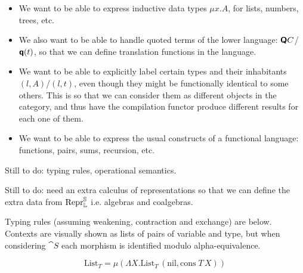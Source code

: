 \begin{itemize}
  \item We want to be able to express inductive data types $\mu x . A$, for lists,
        numbers, trees, etc.
  \item We also want to be able to handle quoted terms of the lower language: $\textsf{\textbf{Q}}
          C$/$\textsf{\textbf{q}}(t)$, so that we can define translation functions in the language.
  \item We want to be able to explicitly label certain types and their inhabitants $(l,
          A)$/$(l, t)$, even though they might be functionally identical to some others.
        This is so that we can consider them as different objects in the category, and
        thus have the compilation functor produce different results for each one of
        them.
  \item We want to be able to express the usual constructs of a functional language:
        functions, pairs, sums, recursion, etc.
\end{itemize}

Still to do: typing rules, operational semantics.

Still to do: need an extra calculus of representations so that we can define
the extra data from $\mathrm{Repr} _{\mathbb L} ^{\mathbb S}$ i.e. algebras and coalgebras.

Typing rules (assuming weakening, contraction and exchange) are below. Contexts
are visually shown as lists of pairs of variable and type, but when considering
$\cat S$ each morphism is identified modulo alpha-equivalence.

$$
  \text{List}_T = \mu (\Lambda X. \text{List}_T \, (\text{nil}, \text{cons}\; T\, X) )
$$

